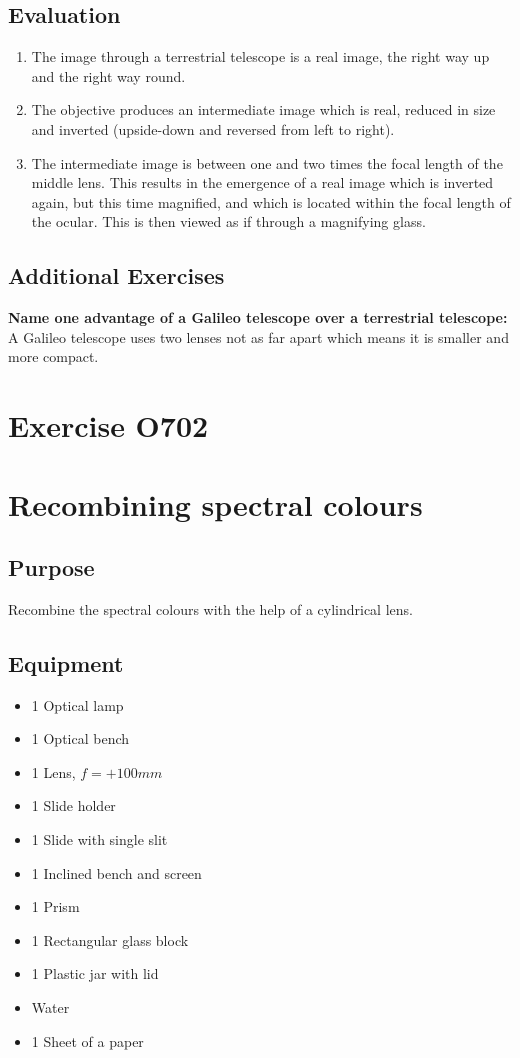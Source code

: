 \documentclass[12pt]{article}
\begin{document}
\subsection*{Evaluation}
\begin{enumerate}
    \item The image through a terrestrial telescope is a real image, the right way up and the right way round. 
    \item The objective produces an intermediate image which is real, reduced in size and inverted (upside-down and reversed from left to right). 
    \item The intermediate image is between one and two times the focal length of the middle lens. This results in the emergence of a real image which is inverted again, but this time magnified, and which is located within the focal length of the ocular. This is then viewed as if through a magnifying glass. 
\end{enumerate}

\subsection*{Additional Exercises}
\textbf{Name one advantage of a Galileo telescope over a terrestrial telescope:}\\
A Galileo telescope uses two lenses not as far apart which means it is smaller and more compact. 

\newpage
\section*{Exercise O702}

\section*{Recombining spectral colours}

\subsection*{Purpose}
Recombine the spectral colours with the help of a cylindrical lens.

\subsection*{Equipment}
\begin{itemize}
    \item 1 Optical lamp
    \item 1 Optical bench
    \item 1 Lens, $f=+100 mm$
    \item 1 Slide holder
    \item 1 Slide with single slit
    \item 1 Inclined bench and screen
    \item 1 Prism
    \item 1 Rectangular glass block
    \item 1 Plastic jar with lid
    \item Water
    \item 1 Sheet of a paper
\end{itemize}
\end{document}
